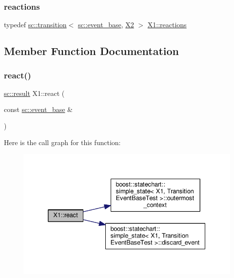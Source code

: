 \mbox{\label{struct_x1_acc9fac15f3125efb8a45a3441feb1edc}} 
\subsubsection{\texorpdfstring{reactions}{reactions}\hspace{0.1cm}{\footnotesize\ttfamily [3/3]}}
{\footnotesize\ttfamily typedef \mbox{\hyperlink{classboost_1_1statechart_1_1transition}{sc\+::transition}}$<$ \mbox{\hyperlink{classboost_1_1statechart_1_1event__base}{sc\+::event\+\_\+base}}, \mbox{\hyperlink{struct_x2}{X2}} $>$ \mbox{\hyperlink{struct_x1_ab14c7f72d0b9d16885940a5e36752fa6}{X1\+::reactions}}}



\subsection{Member Function Documentation}
\mbox{\label{struct_x1_a23e285378cd818ce69280830ca220079}} 
\subsubsection{\texorpdfstring{react()}{react()}}
{\footnotesize\ttfamily \mbox{\hyperlink{namespaceboost_1_1statechart_abe807f6598b614d6d87bb951ecd92331}{sc\+::result}} X1\+::react (\begin{DoxyParamCaption}\item[{const \mbox{\hyperlink{classboost_1_1statechart_1_1event__base}{sc\+::event\+\_\+base}} \&}]{ }\end{DoxyParamCaption})\hspace{0.3cm}{\ttfamily [inline]}}

Here is the call graph for this function\+:
\nopagebreak
\begin{figure}[H]
\begin{center}
\leavevmode
\includegraphics[width=332pt]{struct_x1_a23e285378cd818ce69280830ca220079_cgraph}
\end{center}
\end{figure}


